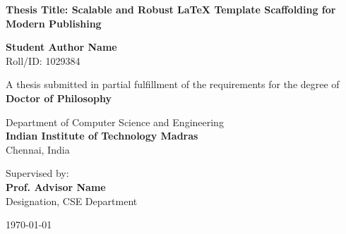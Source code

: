 \begin{titlepage}
\begin{center}
    \vspace*{1cm}
    
    
    \vspace{1.5cm}
    
    {\huge \bfseries \color{primary} Thesis Title: Scalable and Robust LaTeX Template Scaffolding for Modern Publishing}
    
    \vspace{1.5cm}
    
    {\Large \bfseries Student Author Name} \\
    \vspace{0.2cm}
    {Roll/ID: 1029384}
    
    \vspace{1.5cm}
    
    {A thesis submitted in partial fulfillment of the requirements for the degree of} \\
    \vspace{0.3cm}
    {\large \bfseries \color{secondary} Doctor of Philosophy}
    
    \vspace{1.5cm}
    
    {\large Department of Computer Science and Engineering} \\
    \vspace{0.2cm}
    {\large \bfseries \color{primary} Indian Institute of Technology Madras} \\
    \vspace{0.1cm}
    {Chennai, India}
    
    \vfill
    
    {Supervised by:} \\
    {\large \bfseries Prof. Advisor Name} \\
    {Designation, CSE Department}
    
    \vspace{1cm}
    
    {\large \today}
    
\end{center}
\end{titlepage}
